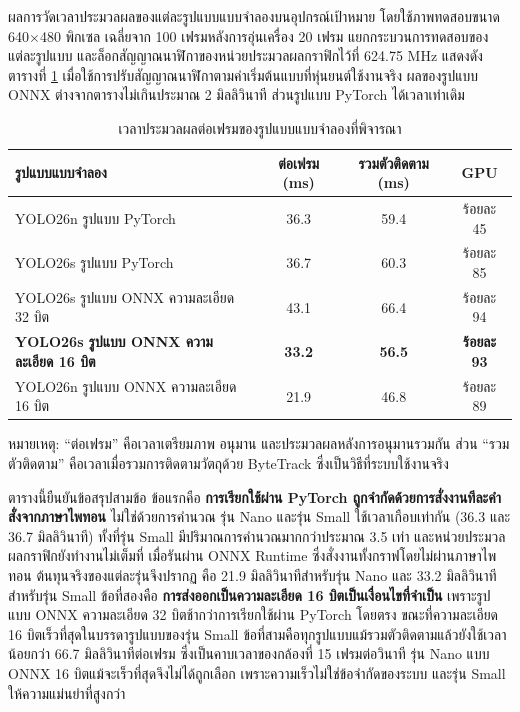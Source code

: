 \documentclass[a4paper,12pt]{report}
\begin{document}
ผลการวัดเวลาประมวลผลของแต่ละรูปแบบแบบจำลองบนอุปกรณ์เป้าหมาย
โดยใช้ภาพทดสอบขนาด 640$\times$480 พิกเซล เฉลี่ยจาก 100 เฟรมหลังการอุ่นเครื่อง 20 เฟรม
แยกกระบวนการทดสอบของแต่ละรูปแบบ และล็อกสัญญาณนาฬิกาของหน่วยประมวลผลกราฟิกไว้ที่ 624.75 MHz
แสดงดังตารางที่ \ref{tab:modelbench}
เมื่อใช้การปรับสัญญาณนาฬิกาตามค่าเริ่มต้นแบบที่หุ่นยนต์ใช้งานจริง
ผลของรูปแบบ ONNX ต่างจากตารางไม่เกินประมาณ 2 มิลลิวินาที
ส่วนรูปแบบ PyTorch ได้เวลาเท่าเดิม

\begin{table}[htbp]
\centering
\caption[เวลาประมวลผลต่อเฟรมของรูปแบบแบบจำลองที่พิจารณา (บทที่ 4)]{เวลาประมวลผลต่อเฟรมของรูปแบบแบบจำลองที่พิจารณา}
\label{tab:modelbench}
\small
\begin{tabularx}{\textwidth}{|X|c|c|c|}
\hline
\textbf{รูปแบบแบบจำลอง} & \textbf{ต่อเฟรม (ms)} & \textbf{รวมตัวติดตาม (ms)} & \textbf{GPU} \\
\hline
YOLO26n รูปแบบ PyTorch & 36.3 & 59.4 & ร้อยละ 45 \\
\hline
YOLO26s รูปแบบ PyTorch & 36.7 & 60.3 & ร้อยละ 85 \\
\hline
YOLO26s รูปแบบ ONNX ความละเอียด 32 บิต & 43.1 & 66.4 & ร้อยละ 94 \\
\hline
\textbf{YOLO26s รูปแบบ ONNX ความละเอียด 16 บิต} & \textbf{33.2} & \textbf{56.5} & \textbf{ร้อยละ 93} \\
\hline
YOLO26n รูปแบบ ONNX ความละเอียด 16 บิต & 21.9 & 46.8 & ร้อยละ 89 \\
\hline
\end{tabularx}
\end{table}

หมายเหตุ: ``ต่อเฟรม'' คือเวลาเตรียมภาพ อนุมาน และประมวลผลหลังการอนุมานรวมกัน
ส่วน ``รวมตัวติดตาม'' คือเวลาเมื่อรวมการติดตามวัตถุด้วย ByteTrack ซึ่งเป็นวิธีที่ระบบใช้งานจริง

ตารางนี้ยืนยันข้อสรุปสามข้อ
ข้อแรกคือ \textbf{การเรียกใช้ผ่าน PyTorch ถูกจำกัดด้วยการสั่งงานทีละคำสั่งจากภาษาไพทอน}
ไม่ใช่ด้วยการคำนวณ รุ่น Nano และรุ่น Small ใช้เวลาเกือบเท่ากัน (36.3 และ 36.7 มิลลิวินาที)
ทั้งที่รุ่น Small มีปริมาณการคำนวณมากกว่าประมาณ 3.5 เท่า
และหน่วยประมวลผลกราฟิกยังทำงานไม่เต็มที่
เมื่อรันผ่าน ONNX Runtime ซึ่งสั่งงานทั้งกราฟโดยไม่ผ่านภาษาไพทอน
ต้นทุนจริงของแต่ละรุ่นจึงปรากฏ คือ 21.9 มิลลิวินาทีสำหรับรุ่น Nano และ 33.2 มิลลิวินาทีสำหรับรุ่น Small
ข้อที่สองคือ \textbf{การส่งออกเป็นความละเอียด 16 บิตเป็นเงื่อนไขที่จำเป็น}
เพราะรูปแบบ ONNX ความละเอียด 32 บิตช้ากว่าการเรียกใช้ผ่าน PyTorch โดยตรง
ขณะที่ความละเอียด 16 บิตเร็วที่สุดในบรรดารูปแบบของรุ่น Small
ข้อที่สามคือทุกรูปแบบแม้รวมตัวติดตามแล้วยังใช้เวลาน้อยกว่า 66.7 มิลลิวินาทีต่อเฟรม
ซึ่งเป็นคาบเวลาของกล้องที่ 15 เฟรมต่อวินาที
รุ่น Nano แบบ ONNX 16 บิตแม้จะเร็วที่สุดจึงไม่ได้ถูกเลือก
เพราะความเร็วไม่ใช่ข้อจำกัดของระบบ และรุ่น Small ให้ความแม่นยำที่สูงกว่า
\end{document}
